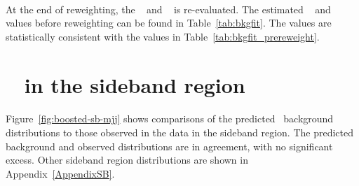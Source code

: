 \paragraph{}
At the end of reweighting, the \muqcd~ and \alphatt~ is re-evaluated. The estimated \muqcd~ and \alphatt~ values before reweighting can be found in Table~\ref{tab:bkgfit}. 
The values are statistically consistent with the values in Table~\ref{tab:bkgfit_prereweight}.



\clearpage
\section{\mtwoJ~ in the sideband region}
\label{sec:boosted-sb}

\paragraph{}
Figure~\ref{fig:boosted-sb-mjj} shows comparisons of the predicted \mtwoJ~background distributions to those observed in the data in the sideband region.
The predicted background and observed distributions are in agreement, with no significant excess.
Other sideband region distributions are shown in Appendix~\ref{AppendixSB}.

